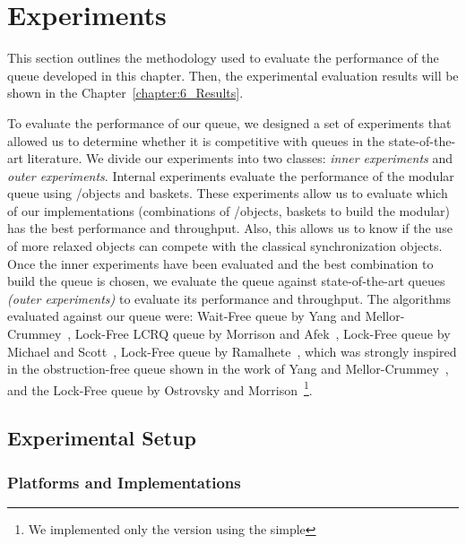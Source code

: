 \section{\label{sec:queue-experiments}Experiments}

This section outlines the methodology used to evaluate the performance of the queue developed in this chapter. Then, the experimental evaluation results will be shown in the Chapter~\ref{chapter:6_Results}.

To evaluate the performance of our queue, we designed a set of experiments that allowed us to determine whether it is competitive with queues in the state-of-the-art literature.
We divide our experiments into two classes: \emph{inner experiments} and \emph{outer experiments}.
Internal experiments evaluate the performance of the modular queue using \LL/\IC objects and baskets. These experiments allow us to evaluate which of our implementations (combinations of \LL/\IC objects, baskets to build the modular) has the best performance and throughput. Also, this allows us to know if the use of more relaxed objects can compete with the classical synchronization objects. Once the inner experiments have been evaluated and the best combination to build the queue is chosen, we evaluate the queue against state-of-the-art queues \emph{(outer experiments)} to evaluate its performance and throughput. The algorithms evaluated against our queue were: Wait-Free queue by Yang and Mellor-Crummey~\cite{DBLP_conf_ppopp_YangM16}, Lock-Free LCRQ queue by Morrison and Afek~\cite{ppopp2013x86queues}, Lock-Free queue by Michael and Scott~\cite{DBLP_conf_podc_MichaelS96}, Lock-Free queue by Ramalhete~\cite{Ramalhete_Correia_MPMC_2016}, which was strongly inspired in the obstruction-free queue shown in the work of Yang and Mellor-Crummey~\cite{DBLP_conf_ppopp_YangM16}, and the Lock-Free queue by Ostrovsky and Morrison~\cite{scalingconcurrent2020}\footnote{We implemented only the version using the simple \CAS}.

\subsection{\label{subsec:queue-experimental-setup}Experimental Setup}
\subsubsection{Platforms and Implementations}

